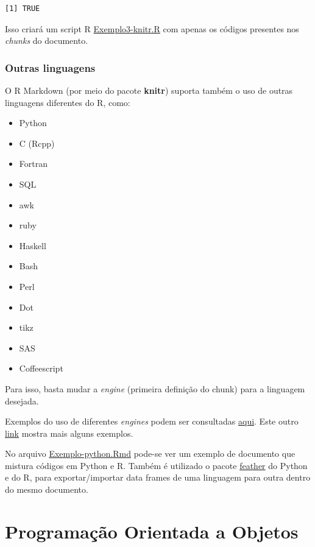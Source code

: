\documentclass[10pt,a4paper]{book}
\providecommand{\tightlist}{%
  \setlength{\itemsep}{0pt}\setlength{\parskip}{0pt}}
\begin{document}
\begin{verbatim}
[1] TRUE
\end{verbatim}

Isso criará um script R
\href{exemplos/Exemplo3-knitr.R}{Exemplo3-knitr.R} com apenas os códigos
presentes nos \emph{chunks} do documento.

\subsection{Outras linguagens}\label{outras-linguagens}

O R Markdown (por meio do pacote \textbf{knitr}) suporta também o uso de
outras linguagens diferentes do R, como:

\begin{itemize}
\tightlist
\item
  Python
\item
  C (Rcpp)
\item
  Fortran
\item
  SQL
\item
  awk
\item
  ruby
\item
  Haskell
\item
  Bash
\item
  Perl
\item
  Dot
\item
  tikz
\item
  SAS
\item
  Coffeescript
\end{itemize}

Para isso, basta mudar a \emph{engine} (primeira definição do chunk)
para a linguagem desejada.

Exemplos do uso de diferentes \emph{engines} podem ser consultadas
\href{https://yihui.name/knitr/demo/engines/}{aqui}. Este outro
\href{https://rmarkdown.rstudio.com/authoring_knitr_engines.html}{link}
mostra mais alguns exemplos.

No arquivo \href{exemplos/Exemplo-python.Rmd}{Exemplo-python.Rmd}
pode-se ver um exemplo de documento que mistura códigos em Python e R.
Também é utilizado o pacote
\href{https://blog.rstudio.com/2016/03/29/feather/}{feather} do Python e
do R, para exportar/importar data frames de uma linguagem para outra
dentro do mesmo documento.

\chapter{Programação Orientada a
Objetos}\label{programauxe7uxe3o-orientada-a-objetos}
\end{document}

